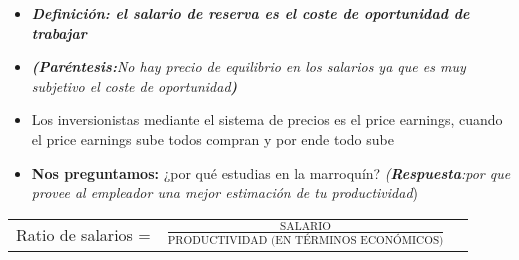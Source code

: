 \begin{itemize}
    \item \textbf{\emph{Definición: el salario de reserva es el coste de oportunidad de trabajar}}
    \item \emph{\textbf{(Paréntesis:}No hay precio de equilibrio en los salarios ya que es muy subjetivo el coste de oportunidad\textbf{)}}
    \item Los inversionistas mediante el sistema de precios es el price earnings, cuando el price earnings sube todos compran y por ende todo sube
    \item \textbf{Nos preguntamos:} ¿por qué estudias en la marroquín? \emph{(\textbf{Respuesta}:por que provee al empleador una mejor estimación de tu productividad})
\end{itemize}

\begin{tabular}{ |c|c|c| } 
    Ratio de salarios = &  $\frac{\text{SALARIO}}{\text{PRODUCTIVIDAD (EN TÉRMINOS ECONÓMICOS)}}$ \\
\end{tabular}
  


